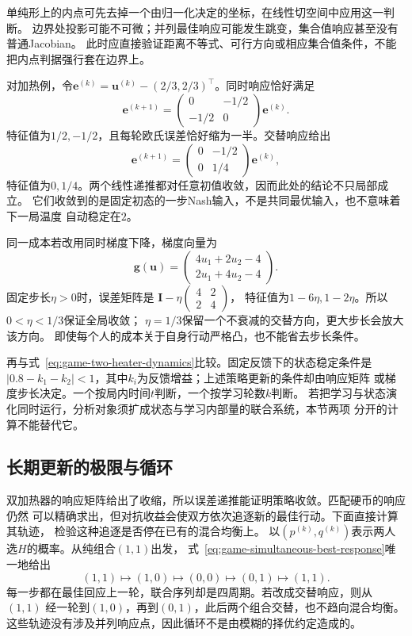 单纯形上的内点可先去掉一个由归一化决定的坐标，在线性切空间中应用这一判断。
边界处投影可能不可微；并列最佳响应可能发生跳变，集合值响应甚至没有普通Jacobian。
此时应直接验证距离不等式、可行方向或相应集合值条件，不能把内点判据强行套在边界上。

对加热例，令\(\bm e^{(k)}=\bm u^{(k)}-(2/3,2/3)^\top\)。同时响应恰好满足
\begin{equation}
  \bm e^{(k+1)}
  =
  \begin{pmatrix}0&-1/2\\-1/2&0\end{pmatrix}\bm e^{(k)}.
  \label{eq:game-heater-response-error}
\end{equation}
特征值为\(1/2,-1/2\)，且每轮欧氏误差恰好缩为一半。交替响应给出
\[
  \bm e^{(k+1)}
  =
  \begin{pmatrix}0&-1/2\\0&1/4\end{pmatrix}\bm e^{(k)},
\]
特征值为\(0,1/4\)。两个线性递推都对任意初值收敛，因而此处的结论不只局部成立。
它们收敛到的是固定初态的一步Nash输入，不是共同最优输入，也不意味着下一局温度
自动稳定在\(2\)。

同一成本若改用同时梯度下降，梯度向量为
\[
  \bm g(\bm u)=
  \begin{pmatrix}4u_1+2u_2-4\\2u_1+4u_2-4\end{pmatrix}.
\]
固定步长\(\eta>0\)时，误差矩阵是
\(\bm I-\eta\left(\begin{smallmatrix}4&2\\2&4\end{smallmatrix}\right)\)，
特征值为\(1-6\eta,1-2\eta\)。所以\(0<\eta<1/3\)保证全局收敛；
\(\eta=1/3\)保留一个不衰减的交替方向，更大步长会放大该方向。
即使每个人的成本关于自身行动严格凸，也不能省去步长条件。

再与式~\eqref{eq:game-two-heater-dynamics}比较。固定反馈下的状态稳定条件是
\(|0.8-k_1-k_2|<1\)，其中\(k_i\)为反馈增益；上述策略更新的条件却由响应矩阵
或梯度步长决定。一个按局内时间\(t\)判断，一个按学习轮数\(k\)判断。
若把学习与状态演化同时运行，分析对象须扩成状态与学习内部量的联合系统，本节两项
分开的计算不能替代它。

\subsection{长期更新的极限与循环}
\label{sec:game-limits-cycles}

双加热器的响应矩阵给出了收缩，所以误差递推能证明策略收敛。匹配硬币的响应仍然
可以精确求出，但对抗收益会使双方依次追逐新的最佳行动。下面直接计算其轨迹，
检验这种追逐是否停在已有的混合均衡上。
以\((p^{(k)},q^{(k)})\)表示两人选\(H\)的概率。从纯组合\((1,1)\)出发，
式~\eqref{eq:game-simultaneous-best-response}唯一地给出
\[
  (1,1)\longmapsto(1,0)\longmapsto(0,0)
  \longmapsto(0,1)\longmapsto(1,1).
\]
每一步都在最佳回应上一轮，联合序列却是四周期。若改成交替响应，则从\((1,1)\)
经一轮到\((1,0)\)，再到\((0,1)\)，此后两个组合交替，也不趋向混合均衡。
这些轨迹没有涉及并列响应点，因此循环不是由模糊的择优约定造成的。

